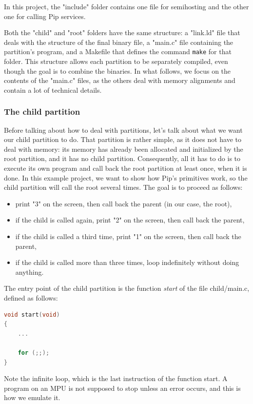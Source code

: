 \documentclass[10pt,a4paper,titlepage]{refart}
\begin{document}
In this project, the "include" folder contains one file for semihosting and the other one for calling Pip services.

Both the "child" and "root" folders have the same structure:
a "link{.}ld" file that deals with the structure of the final binary file, a "main{.}c" file containing the partition's program, and 
a Makefile that defines the command \texttt{make} for that folder. This structure allows each partition to be separately compiled, 
even though the goal is to combine the binaries. In what follows, we focus on the contents of the "main{.}c" files, as the others 
deal with memory alignments and contain a lot of technical details.

\subsubsection{The child partition}


Before talking about how to deal with partitions, let's talk about what we want our child partition to do. That partition is rather 
simple, as it does not have to deal with memory: its memory has already been allocated and initialized by the root partition, and 
it has no child partition. Consequently, all it has to do is to execute its own program and call back the root partition at least 
once, when it is done. In this example project, we want to show how Pip's primitives work, so the child partition will call the 
root several times. The goal is to proceed as follows:
\begin{itemize}
    \item print "3" on the screen, then call back the parent (in our case, the root),
    \item if the child is called again, print "2" on the screen, then call back the parent,
    \item if the child is called a third time, print "1" on the screen, then call back the parent,
    \item if the child is called more than three times, loop indefinitely without doing anything.
\end{itemize}
The entry point of the child partition is the function \textit{start} of the file child/main{.}c, defined as follows:
\begin{lstlisting}[language=C]
void start(void)
{
    ...

	for (;;);
}
\end{lstlisting}
Note the infinite loop, which is the last instruction of the function start. A program on an MPU is not supposed to stop unless an error 
occurs, and this is how we emulate it.
\end{document}
